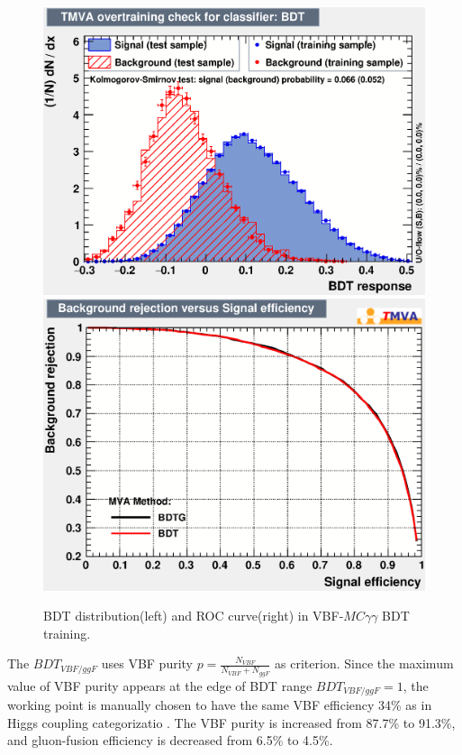 \begin{figure}[bp]
  \centering
  \includegraphics[width=0.45\linewidth]{figure/BDT/Perf_yy/overtrain_BDT.eps}
  \includegraphics[width=0.45\linewidth]{figure/BDT/Perf_yy/rejBvsS.eps}
  \caption{BDT distribution(left) and ROC curve(right) in VBF-$MC \gamma\gamma$ BDT training.}
  \label{fig:ROC_yy}
\end{figure}

The $BDT_{VBF/ggF}$ uses VBF purity $p= \frac{N_{VBF}}{N_{VBF}+N_{ggF}}$ as criterion. Since the maximum value of VBF purity appears at the edge of BDT range $BDT_{VBF/ggF}=1$, the working point is manually chosen to have the same VBF efficiency 34\% as in Higgs coupling categorizatio . The VBF purity is increased from 87.7\% to 91.3\%, and gluon-fusion efficiency is decreased from 6.5\% to 4.5\%. \\

